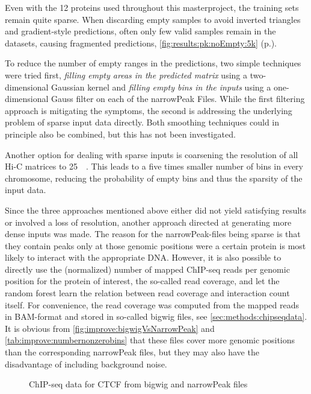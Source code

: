 Even with the 12 proteins used throughout this masterproject,
the training sets remain quite sparse.
When discarding empty samples to avoid inverted triangles and gradient-style predictions, often only few valid samples
remain in the datasets, causing fragmented predictions, \autoref{fig:results:pk:noEmpty:5k} (p.\;\pageref{fig:results:pk:noEmpty:5k}).

To reduce the number of empty ranges in the predictions, two simple techniques were tried first,
\emph{filling empty areas in the predicted matrix} using a two-dimensional Gaussian kernel and 
\emph{filling empty bins in the inputs} using a one-dimensional Gauss filter on each of the narrowPeak Files.
While the first filtering approach is mitigating the symptoms, 
the second is addressing the underlying problem of sparse input data directly.
Both smoothing techniques could in principle also be combined, but this has not been investigated.

Another option for dealing with sparse inputs 
is coarsening the resolution of all Hi-C matrices to \SI{25}{\kilo\bp}.
This leads to a five times smaller number of bins in every chromosome, 
reducing the probability of empty bins and thus the sparsity of the input data.

Since the three approaches mentioned above either did not yield satisfying results or involved a loss of resolution, 
another approach directed at generating more dense inputs was made.
The reason for the narrowPeak-files being sparse is that they contain peaks only at
those genomic positions were a certain protein is most likely to interact with the appropriate DNA.
However, it is also possible to directly use the (normalized) number of mapped ChIP-seq reads per genomic position for the 
protein of interest, the so-called read coverage, and let the random forest learn the relation
between read coverage and interaction count itself.
For convenience, the read coverage was computed from the mapped reads in BAM-format and stored in so-called bigwig files, see \autoref{sec:methods:chipseqdata}.
It is obvious from \autoref{fig:improve:bigwigVsNarrowPeak} and \autoref{tab:improve:numbernonzerobins} 
that these files cover more genomic positions than the corresponding narrowPeak files, 
but they may also have the  disadvantage of including background noise.
\begin{figure}[htb]
 \centering
 \small
 \caption{ChIP-seq data for CTCF from bigwig and narrowPeak files}
 \label{fig:improve:bigwigVsNarrowPeak}
\end{figure}

